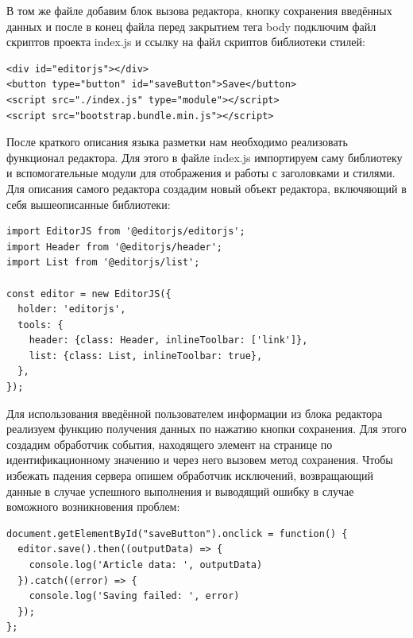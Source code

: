 \documentclass[master, och, diploma]{SCWorks}
\begin{document}
В том же файле добавим блок вызова редактора, кнопку сохранения введённых данных и после в конец файла перед закрытием тега body подключим файл скриптов проекта index.js и ссылку на файл скриптов библиотеки стилей:
\begin{verbatim}
<div id="editorjs"></div>
<button type="button" id="saveButton">Save</button>
<script src="./index.js" type="module"></script>
<script src="bootstrap.bundle.min.js"></script>
\end{verbatim}

После краткого описания языка разметки нам необходимо реализовать функционал редактора. Для этого в файле index.js импортируем саму библиотеку и вспомогательные модули для отображения и работы с заголовками и стилями. Для описания самого редактора создадим новый объект редактора, включяющий в себя вышеописанные библиотеки:
\begin{verbatim}
import EditorJS from '@editorjs/editorjs'; 
import Header from '@editorjs/header'; 
import List from '@editorjs/list'; 

const editor = new EditorJS({ 
  holder: 'editorjs', 
  tools: { 
    header: {class: Header, inlineToolbar: ['link']}, 
    list: {class: List, inlineToolbar: true},
  }, 
});
\end{verbatim}

Для использования введённой пользователем информации из блока редактора реализуем функцию получения данных по нажатию кнопки сохранения. Для этого создадим обработчик события, находящего элемент на странице по идентификационному значению и через него вызовем метод сохранения. Чтобы избежать падения сервера опишем обработчик исключений, возвращающий данные в случае успешного выполнения и выводящий ошибку в случае воможного возникновения проблем:
\begin{verbatim}
document.getElementById("saveButton").onclick = function() {
  editor.save().then((outputData) => {
    console.log('Article data: ', outputData)
  }).catch((error) => {
    console.log('Saving failed: ', error)
  });
};   
\end{verbatim}
\end{document}
